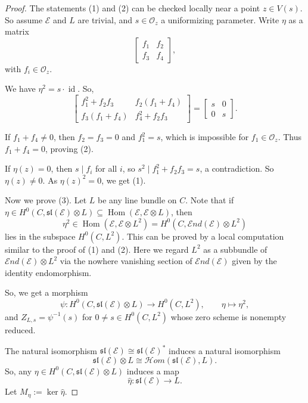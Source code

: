 \documentclass[10pt,a4paper]{amsart}
\begin{document}
\begin{proof}
The statements (1) and (2) can be checked locally near a point $z\in V(s)$. So assume $\mathcal{E}$ and $L$ are trivial, and $s\in\mathcal{O}_{z}$ a uniformizing parameter. Write $\eta$ as a matrix
\[
\begin{bmatrix}
f_1 & f_2\\
f_3 & f_4
\end{bmatrix},
\]
with $f_i\in\mathcal{O}_z$.

We have $\eta^2=s\cdot\operatorname{id}$. So,
\[
\begin{bmatrix}
f_1^2+f_2f_3 & f_2(f_1+f_4)\\
f_3(f_1+f_4) & f_4^2+f_2f_3
\end{bmatrix}
=
\begin{bmatrix}
s & 0\\
0 & s
\end{bmatrix}.
\]

If $f_1+f_4\neq 0$, then $f_2=f_3=0$ and $f_1^2=s$, which is impossible for $f_1\in\mathcal{O}_z$. Thus $f_1+f_4=0$, proving (2).

If $\eta(z)=0$, then $s\mid f_i$ for all $i$, so $s^2\mid f_1^2+f_2f_3=s$, a contradiction. So $\eta(z)\neq 0$. As $\eta(z)^2=0$, we get (1).

Now we prove (3). Let $L$ be any line bundle on $C$. Note that if $\eta\in H^0(C,\mathfrak{sl}(\mathcal{E})\otimes L)\subseteq\operatorname{Hom}(\mathcal{E},\mathcal{E}\otimes L)$, then
\[
\eta^2\in\operatorname{Hom}(\mathcal{E},\mathcal{E}\otimes L^2)
=H^0(C,\mathcal{E}nd(\mathcal{E})\otimes L^2)
\]
lies in the subspace $H^0(C,L^2)$. This can be proved by a local computation similar to the proof of (1) and (2). Here we regard $L^2$ as a subbundle of $\mathcal{E}nd(\mathcal{E})\otimes L^2$ via the nowhere vanishing section of $\mathcal{E}nd(\mathcal{E})$ given by the identity endomorphism.

So, we get a morphism
\[
\psi:H^0(C,\mathfrak{sl}(\mathcal{E})\otimes L)\longrightarrow H^0(C,L^2),
\qquad
\eta\longmapsto \eta^2,
\]
and $Z_{L,s}=\psi^{-1}(s)$ for $0\neq s\in H^0(C,L^2)$ whose zero scheme is nonempty reduced.

The natural isomorphism $\mathfrak{sl}(\mathcal{E})\cong \mathfrak{sl}(\mathcal{E})^*$ induces a natural isomorphism
\[
\mathfrak{sl}(\mathcal{E})\otimes L\cong \mathcal{H}om(\mathfrak{sl}(\mathcal{E}),L).
\]
So, any $\eta\in H^0(C,\mathfrak{sl}(\mathcal{E})\otimes L)$ induces a map
\[
\widehat{\eta}:\mathfrak{sl}(\mathcal{E})\longrightarrow L.
\]Let $M_\eta:=\ker\widehat{\eta}$.


\end{proof}
\end{document}
